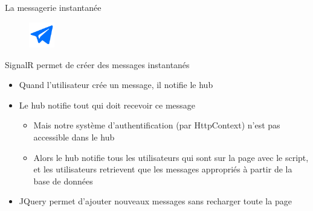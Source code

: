 \begin{frame}{La messagerie instantanée}
\begin{figure}[h!]
  \includegraphics[width=0.10\textwidth]{images/-59-512}
\end{figure}

  SignalR permet de créer des messages instantanés
  \begin{itemize}
  \item Quand l'utilisateur crée un message, il notifie le hub
  \item Le hub notifie tout qui doit recevoir ce message
    \begin{itemize}
    \item Mais notre système d'authentification (par HttpContext) n'est pas accessible dans le hub
    \item Alors le hub notifie tous les utilisateurs qui sont sur la page avec le script, et les utilisateurs retrievent que les messages appropriés à partir de la base de données
    \end{itemize}
  \item JQuery permet d'ajouter nouveaux messages sans recharger toute la page
  \end{itemize}
\end{frame}